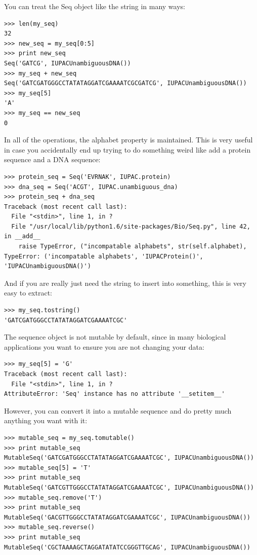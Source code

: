 \documentclass{article}
\begin{document}
You can treat the Seq object like the string in many ways:

\begin{verbatim}
>>> len(my_seq)
32
>>> new_seq = my_seq[0:5]
>>> print new_seq
Seq('GATCG', IUPACUnambiguousDNA())
>>> my_seq + new_seq
Seq('GATCGATGGGCCTATATAGGATCGAAAATCGCGATCG', IUPACUnambiguousDNA())
>>> my_seq[5]
'A'
>>> my_seq == new_seq
0
\end{verbatim}

In all of the operations, the alphabet property is maintained. This is very useful in case you accidentally end up trying to do something weird like add a protein sequence and a DNA sequence:

\begin{verbatim}
>>> protein_seq = Seq('EVRNAK', IUPAC.protein)
>>> dna_seq = Seq('ACGT', IUPAC.unambiguous_dna)
>>> protein_seq + dna_seq
Traceback (most recent call last):
  File "<stdin>", line 1, in ?
  File "/usr/local/lib/python1.6/site-packages/Bio/Seq.py", line 42, in __add__
    raise TypeError, ("incompatable alphabets", str(self.alphabet),
TypeError: ('incompatable alphabets', 'IUPACProtein()', 'IUPACUnambiguousDNA()')
\end{verbatim}


And if you are really just need the string to insert into something, this is very easy to extract:

\begin{verbatim}
>>> my_seq.tostring()
'GATCGATGGGCCTATATAGGATCGAAAATCGC'
\end{verbatim} 

The sequence object is not mutable by default, since in many biological applications you want to ensure you are not changing your data:

\begin{verbatim}
>>> my_seq[5] = 'G'
Traceback (most recent call last):
  File "<stdin>", line 1, in ?
AttributeError: 'Seq' instance has no attribute '__setitem__'
\end{verbatim}

However, you can convert it into a mutable sequence and do pretty much anything you want with it:

\begin{verbatim}
>>> mutable_seq = my_seq.tomutable()
>>> print mutable_seq
MutableSeq('GATCGATGGGCCTATATAGGATCGAAAATCGC', IUPACUnambiguousDNA())
>>> mutable_seq[5] = 'T'
>>> print mutable_seq
MutableSeq('GATCGTTGGGCCTATATAGGATCGAAAATCGC', IUPACUnambiguousDNA())
>>> mutable_seq.remove('T')
>>> print mutable_seq
MutableSeq('GACGTTGGGCCTATATAGGATCGAAAATCGC', IUPACUnambiguousDNA())
>>> mutable_seq.reverse()
>>> print mutable_seq
MutableSeq('CGCTAAAAGCTAGGATATATCCGGGTTGCAG', IUPACUnambiguousDNA())
\end{verbatim}
\end{document}
